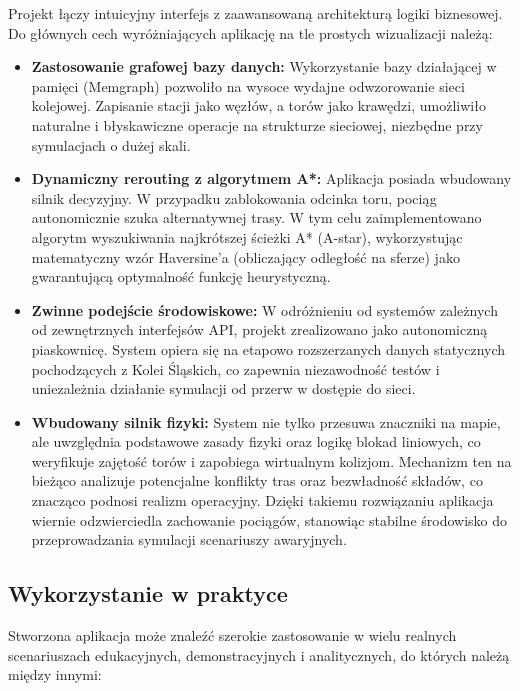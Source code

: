 \documentclass[twoside]{projektInzynierskiMS1z}
\begin{document}
Projekt łączy intuicyjny interfejs z zaawansowaną architekturą logiki biznesowej.
Do głównych cech wyróżniających aplikację na tle prostych wizualizacji należą:

\begin{itemize}
\item \textbf{Zastosowanie grafowej bazy danych:} Wykorzystanie bazy działającej
w pamięci (Memgraph) pozwoliło na wysoce wydajne odwzorowanie sieci kolejowej.
Zapisanie stacji jako węzłów, a torów jako krawędzi, umożliwiło naturalne
i błyskawiczne operacje na strukturze sieciowej, niezbędne przy symulacjach
o dużej skali.

\item \textbf{Dynamiczny rerouting z algorytmem A*:} Aplikacja posiada wbudowany
silnik decyzyjny. W przypadku zablokowania odcinka toru, pociąg autonomicznie szuka
alternatywnej trasy. W tym celu zaimplementowano algorytm wyszukiwania najkrótszej
ścieżki A* (A-star), wykorzystując matematyczny wzór Haversine'a (obliczający
odległość na sferze) jako gwarantującą optymalność funkcję heurystyczną.

\item \textbf{Zwinne podejście środowiskowe:} W odróżnieniu od systemów zależnych
od zewnętrznych interfejsów API, projekt zrealizowano jako autonomiczną piaskownicę.
System opiera się na etapowo rozszerzanych danych statycznych 
pochodzących z Kolei Śląskich, co zapewnia niezawodność testów i uniezależnia działanie symulacji
od przerw w dostępie do sieci.

\item \textbf{Wbudowany silnik fizyki:} System nie tylko przesuwa znaczniki na mapie,
ale uwzględnia podstawowe zasady fizyki oraz logikę blokad liniowych, co weryfikuje
zajętość torów i zapobiega wirtualnym kolizjom. Mechanizm ten na bieżąco analizuje
potencjalne konflikty tras oraz bezwładność składów, co znacząco podnosi realizm
operacyjny. Dzięki takiemu rozwiązaniu aplikacja wiernie odzwierciedla zachowanie
pociągów, stanowiąc stabilne środowisko do przeprowadzania symulacji scenariuszy
awaryjnych.
\end{itemize}

\subsection{Wykorzystanie w praktyce}

Stworzona aplikacja może znaleźć szerokie zastosowanie w wielu realnych scenariuszach
edukacyjnych, demonstracyjnych i analitycznych, do których należą między innymi:
\end{document}

